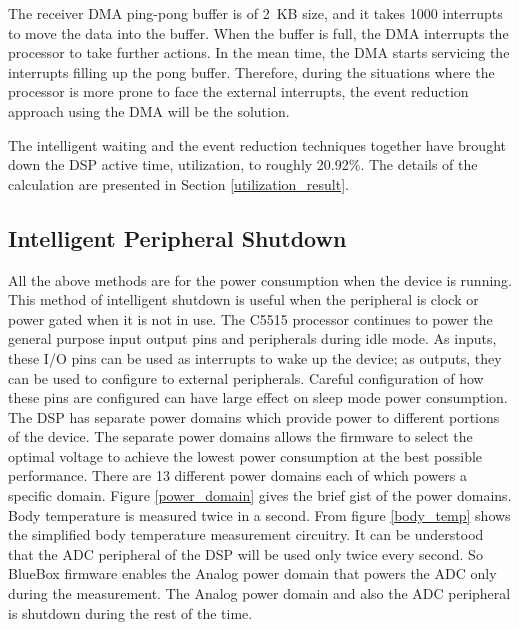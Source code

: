The receiver DMA ping-pong buffer is of 2~KB size, and it takes 1000
interrupts to move the data into the buffer. When the buffer is full,
the DMA interrupts the processor to take further actions. In the mean
time, the DMA starts servicing the interrupts filling up the pong
buffer. Therefore, during the situations where the processor is more
prone to face the external interrupts, the event reduction approach
using the DMA will be the solution.
 
The intelligent waiting and the event reduction techniques together
have brought down the DSP active time, utilization, to roughly
20.92\%. The details of the calculation are presented in Section
\ref{utilization_result}.

\subsection{Intelligent Peripheral Shutdown}

All the above methods are for the power consumption when the device
is running. This method of intelligent shutdown is useful when the
peripheral is clock or power gated when it is not in use. The C5515
processor continues to power the general purpose input output pins
and peripherals during idle mode. As inputs, these I/O pins can be
used as interrupts to wake up the device; as outputs, they can be
used to configure to external peripherals. Careful configuration of
how these pins are configured can have large effect on sleep mode
power consumption. The DSP has separate power domains which provide
power to different portions of the device. The separate power domains
allows the firmware to select the optimal voltage to achieve the
lowest power consumption at the best possible performance. There are
13 different power domains each of which powers a specific domain.
Figure \ref{power_domain} gives the brief gist of the power domains.
Body temperature is measured twice in a second. From figure
\ref{body_temp} shows the simplified body temperature measurement
circuitry. It can be understood that the ADC peripheral of the DSP
will be used only twice every second. So BlueBox firmware enables the
Analog power domain that powers the ADC only during the measurement.
The Analog power domain and also the ADC peripheral is shutdown
during the rest of the time. 


